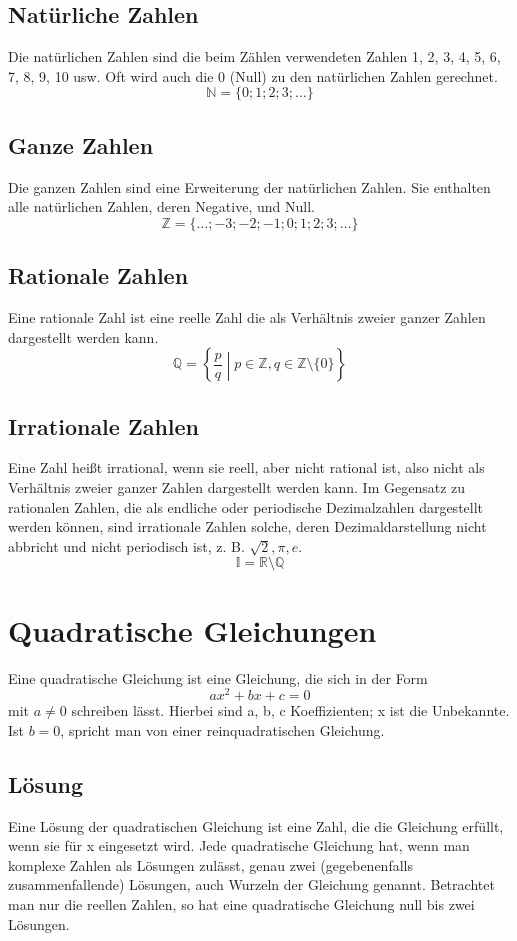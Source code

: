 \documentclass[a4paper]{article}
\begin{document}
\subsection{Natürliche Zahlen}
Die natürlichen Zahlen sind die beim Zählen verwendeten Zahlen 1, 2, 3, 4, 5, 6, 7, 8, 9, 10 usw. Oft wird auch die 0 (Null) zu den natürlichen Zahlen gerechnet.
\[ \mathbb{N} = \{0;1;2;3;\dots\} \]
\subsection{Ganze Zahlen}
Die ganzen Zahlen sind eine Erweiterung der natürlichen Zahlen. Sie enthalten alle natürlichen Zahlen, deren Negative, und Null. \\
\[ \mathbb{Z} = \{\dots;-3;-2;-1;0;1;2;3;\dots\} \]

\subsection{Rationale Zahlen}
Eine rationale Zahl ist eine reelle Zahl die als Verhältnis zweier ganzer Zahlen dargestellt werden kann.
\[ \mathbb{Q} = \left\{\frac{p}{q} \middle| p \in \mathbb{Z}, q \in \mathbb{Z} \setminus \{0\}\right\} \]

\subsection{Irrationale Zahlen}
Eine Zahl heißt irrational, wenn sie reell, aber nicht rational ist, also nicht als Verhältnis zweier ganzer Zahlen dargestellt werden kann. Im Gegensatz zu rationalen Zahlen, die als endliche oder periodische Dezimalzahlen dargestellt werden können, sind irrationale Zahlen solche, deren Dezimaldarstellung nicht abbricht und nicht periodisch ist, z. B. $\sqrt{2}, \pi, e$.
\[ \mathbb{I} = \mathbb{R} \setminus \mathbb{Q} \]

\section{Quadratische Gleichungen}
Eine quadratische Gleichung ist eine Gleichung, die sich in der Form
\[ ax^{2}+bx+c=0 \]
mit $a \neq 0$ schreiben lässt. Hierbei sind a, b, c Koeffizienten; x ist die Unbekannte. Ist $b=0$, spricht man von einer reinquadratischen Gleichung.
\subsection{Lösung}
Eine Lösung der quadratischen Gleichung ist eine Zahl, die die Gleichung erfüllt, wenn sie für x eingesetzt wird. Jede quadratische Gleichung hat, wenn man komplexe Zahlen als Lösungen zulässt, genau zwei (gegebenenfalls zusammenfallende) Lösungen, auch Wurzeln der Gleichung genannt. Betrachtet man nur die reellen Zahlen, so hat eine quadratische Gleichung null bis zwei Lösungen.
\end{document}
